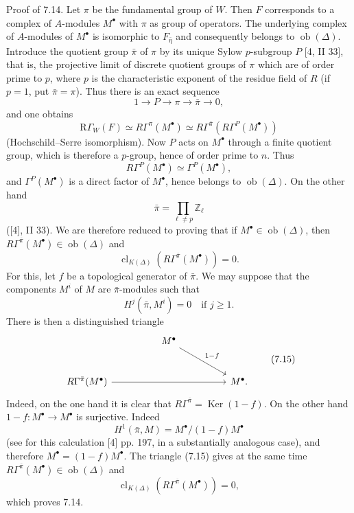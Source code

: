 \documentclass[11pt]{article}
\providecommand{\Ker}{\operatorname{Ker}}
\providecommand{\Ob}{\operatorname{ob}}
\providecommand{\Ker}{\operatorname{Ker}}
\providecommand{\Ker}{\operatorname{Ker}}
\providecommand{\Ob}{\operatorname{ob}}
\providecommand{\Ob}{\operatorname{Ob}}
\providecommand{\clK}[1]{\operatorname{cl}_{K(#1)}}
\providecommand{\RG}{\mathrm R\Gamma}
\providecommand{\Ob}{\operatorname{ob}}
\providecommand{\Ob}{\operatorname{Ob}}
\begin{document}
Proof of 7.14. Let $\pi$ be the fundamental group of $W$. Then $F$ corresponds to a complex of $A$-modules $M^\bullet$ with $\pi$ as group of operators. The underlying complex of $A$-modules of $M^\bullet$ is isomorphic to $F_{\bar\eta}$ and consequently belongs to $\Ob(\Delta)$. Introduce the quotient group $\bar\pi$ of $\pi$ by its unique Sylow $p$-subgroup $P$ [4, II 33], that is, the projective limit of discrete quotient groups of $\pi$ which are of order prime to $p$, where $p$ is the characteristic exponent of the residue field of $R$ (if $p=1$, put $\bar\pi=\pi$). Thus there is an exact sequence
\[
1\longrightarrow P\longrightarrow \pi\longrightarrow \bar\pi\longrightarrow0,
\]
and one obtains
\[
\RG_W(F)\simeq R\Gamma^\pi(M^\bullet)
\simeq R\Gamma^{\bar\pi}(R\Gamma^P(M^\bullet))
\]
(Hochschild--Serre isomorphism). Now $P$ acts on $M^\bullet$ through a finite quotient group, which is therefore a $p$-group, hence of order prime to $n$. Thus
\[
R\Gamma^P(M^\bullet)\simeq \Gamma^P(M^\bullet),
\]
and $\Gamma^P(M^\bullet)$ is a direct factor of $M^\bullet$, hence belongs to $\Ob(\Delta)$. On the other hand
\[
\bar\pi=\prod_{\ell\ne p}\mathbb Z_\ell
\]
([4], II 33). We are therefore reduced to proving that if $M^\bullet\in\Ob(\Delta)$, then $R\Gamma^{\bar\pi}(M^\bullet)\in\Ob(\Delta)$ and
\[
\clK{\Delta}(R\Gamma^{\bar\pi}(M^\bullet))=0.
\]
For this, let $f$ be a topological generator of $\bar\pi$. We may suppose that the components $M^i$ of $M$ are $\bar\pi$-modules such that
\[
H^j(\bar\pi,M^i)=0\quad\text{if }j\ge1.
\]
There is then a distinguished triangle
\[
\begin{tikzcd}[column sep=huge,row sep=large]
& M^\bullet \arrow[dr,"1-f"] &\\
R\Gamma^{\bar\pi}(M^\bullet) \arrow[rr] && M^\bullet .
\end{tikzcd}
\tag{7.15}
\]
Indeed, on the one hand it is clear that $R\Gamma^{\bar\pi}=\Ker(1-f)$. On the other hand $1-f:M^\bullet\to M^\bullet$ is surjective. Indeed
\[
H^1(\bar\pi,M)=M^\bullet/(1-f)M^\bullet
\]
(see for this calculation [4] pp. 197, in a substantially analogous case), and therefore $M^\bullet=(1-f)M^\bullet$. The triangle (7.15) gives at the same time $R\Gamma^{\bar\pi}(M^\bullet)\in\Ob(\Delta)$ and
\[
\clK{\Delta}(R\Gamma^{\bar\pi}(M^\bullet))=0,
\]
which proves 7.14.
\end{document}
